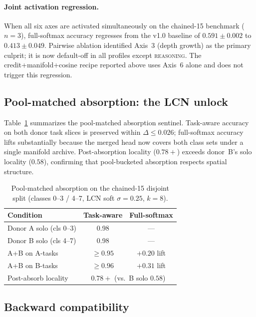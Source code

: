 \documentclass[11pt]{article}
\begin{document}
\paragraph{Joint activation regression.}
When all six axes are activated simultaneously on the chained-15
benchmark ($n{=}3$), full-softmax accuracy regresses from the v1.0
baseline of $0.591 \pm 0.002$ to $0.413 \pm 0.049$.
Pairwise ablation identified Axis~3 (depth growth) as the primary
culprit; it is now default-off in all profiles except \textsc{reasoning}.
The credit+manifold+cosine recipe reported above uses Axis~6 alone and
does not trigger this regression.

\subsection{Pool-matched absorption: the LCN unlock}
\label{sec:results-absorption}

Table~\ref{tab:absorption} summarizes the pool-matched absorption
sentinel.
Task-aware accuracy on both donor task slices is preserved within
$\Delta \leq 0.026$; full-softmax accuracy lifts substantially because
the merged head now covers both class sets under a single manifold
archive.
Post-absorption locality ($0.78{+}$) exceeds donor~B's solo locality
($0.58$), confirming that pool-bucketed absorption respects spatial
structure.

\begin{table}[ht]
\centering
\caption{Pool-matched absorption on the chained-15 disjoint split
  (classes 0--3 / 4--7, LCN soft $\sigma{=}0.25$, $k{=}8$).}
\label{tab:absorption}
\begin{tabular}{lcc}
\toprule
\textbf{Condition} & \textbf{Task-aware} & \textbf{Full-softmax} \\
\midrule
Donor A solo (cls 0--3)   & 0.98  & ---  \\
Donor B solo (cls 4--7)   & 0.98  & ---  \\
A+B on A-tasks            & $\geq 0.95$ & $+0.20$ lift \\
A+B on B-tasks            & $\geq 0.96$ & $+0.31$ lift \\
\midrule
Post-absorb locality      & \multicolumn{2}{c}{$0.78{+}$ (vs.\ B solo $0.58$)} \\
\bottomrule
\end{tabular}
\end{table}

\subsection{Backward compatibility}
\label{sec:results-backcompat}
\end{document}
